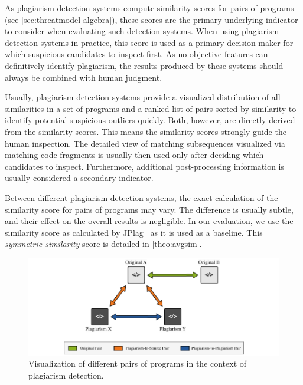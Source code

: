 As plagiarism detection systems compute similarity scores for pairs of programs (see \autoref{sec:threatmodel-algebra}), these scores are the primary underlying indicator to consider when evaluating such detection systems.
When using plagiarism detection systems in practice, this score is used as a primary decision-maker for which suspicious candidates to inspect first.
As no objective features can definitively identify plagiarism, the results produced by these systems should always be combined with human judgment.

Usually, plagiarism detection systems provide a visualized distribution of all similarities in a set of programs and a ranked list of pairs sorted by similarity to identify potential suspicious outliers quickly.
Both, however, are directly derived from the similarity scores.
This means the similarity scores strongly guide the human inspection. The detailed view of matching subsequences visualized via matching code fragments is usually then used only after deciding which candidates to inspect. Furthermore, additional post-processing information is usually considered a secondary indicator.

Between different plagiarism detection systems, the exact calculation of the similarity score for pairs of programs may vary. The difference is usually subtle, and their effect on the overall results is negligible. In our evaluation, we use the similarity score as calculated by JPlag~\cite{prechelt2000} as it is used as a baseline. This \textit{symmetric similarity} score is detailed in \autoref{theo:avgsim}.


\begin{figure}[b]
    \centering
    \includegraphics[width=0.95\linewidth]{figures/methodology/Metrics-Pairs.pdf}
    \caption[Different types of Program Pairs]{Visualization of different pairs of programs in the context of plagiarism detection.}
    \label{fig:pair-types}
\end{figure}

